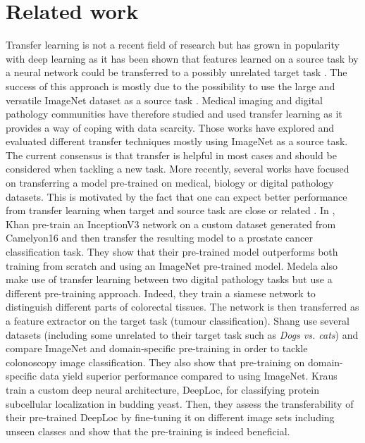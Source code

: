 \section{Related work}
\label{sec:mtask:relatedwork}

Transfer learning is not a recent field of research \cite{pan2010survey} but has grown in popularity with deep learning as it has been shown that features learned on a source task by a neural network could be transferred to a possibly unrelated target task \cite{sermanet2013overfeat, razavian2014cnn, yosinski2014transferable}. The success of this approach is mostly due to the possibility to use the large and versatile ImageNet \cite{deng2009imagenet} dataset as a source task \cite{kornblith2019better}. Medical imaging and digital pathology communities have therefore studied and used transfer learning \cite{tajbakhsh2016convolutional, shin2016deep, mormont2018comparison, babaie2019tissuefold, ponzio2019dealing} as it provides a way of coping with data scarcity. Those works have explored and evaluated different transfer techniques mostly using ImageNet as a source task. The current consensus is that transfer is helpful in most cases and should be considered when tackling a new task. More recently, several works have focused on transferring a model pre-trained on medical, biology or digital pathology datasets. This is motivated by the fact that one can expect better performance from transfer learning when target and source task are close or related \cite{yosinski2014transferable}. In \cite{khan2019improving}, Khan \etal pre-train an InceptionV3 network \cite{szegedy2017inception} on a custom dataset generated from Camelyon16 \cite{bejnordi2017diagnostic} and then transfer the resulting model to a prostate cancer classification task. They show that their pre-trained model outperforms both training from scratch and using an ImageNet pre-trained model. Medela \etal \cite{medela2019few} also make use of transfer learning between two digital pathology tasks but use a different pre-training approach. Indeed, they train a siamese network to distinguish different parts of colorectal tissues. The network is then transferred as a feature extractor on the target task (tumour classification). Shang \etal \cite{shang2019and} use several datasets (including some unrelated to their target task such as \textit{Dogs vs. cats}) and compare ImageNet and domain-specific pre-training in order to tackle colonoscopy image classification. They also show that pre-training on domain-specific data yield superior performance compared to using ImageNet. Kraus \etal \cite{kraus2017automated} train a custom deep neural architecture, DeepLoc, for classifying protein subcellular localization in budding yeast. Then, they assess the transferability of their pre-trained DeepLoc by fine-tuning it on different image sets including unseen classes and show that the pre-training is indeed beneficial.

